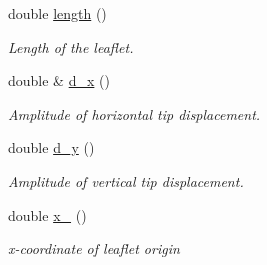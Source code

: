 \begin{DoxyCompactItemize}
double \hyperlink{classLeaflet_a7a28827b7081107ac9e33087598ca868}{length} ()
\begin{DoxyCompactList}\small\item\em Length of the leaflet. \end{DoxyCompactList}\item 
double \& \hyperlink{classLeaflet_a48e4d16790ffd9de527093eac8ff566c}{d\+\_\+x} ()
\begin{DoxyCompactList}\small\item\em Amplitude of horizontal tip displacement. \end{DoxyCompactList}\item 
double \hyperlink{classLeaflet_a8ff8044a3da540c7c9d7a89790b6ee58}{d\+\_\+y} ()
\begin{DoxyCompactList}\small\item\em Amplitude of vertical tip displacement. \end{DoxyCompactList}\item 
double \hyperlink{classLeaflet_af4a819a3ba64960f4b796dc5a0d3eb5b}{x\+\_} ()
\begin{DoxyCompactList}\small\item\em x-\/coordinate of leaflet origin \end{DoxyCompactList}\end{DoxyCompactItemize}
